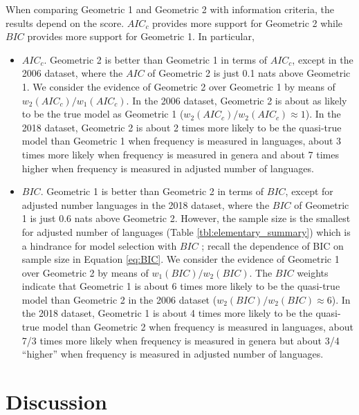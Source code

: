 \documentclass[USenglish]{article}
\begin{document}
When comparing Geometric 1 and Geometric 2 with information criteria, the results depend on the score. $AIC_c$ provides more support for Geometric 2 while $BIC$ provides more support for Geometric 1. In particular,
\begin{itemize}
\item
{\em $AIC_c$}. Geometric 2 is better than Geometric 1 in terms of $AIC_c$, except in the 2006 dataset, where the $AIC$ of Geometric 2 is just 0.1 nats above Geometric 1. 
We consider the evidence of Geometric 2 over Geometric 1 by means of $w_2(AIC_c)/w_1(AIC_c)$. In the 2006 dataset, Geometric 2 is about as likely to be the true model as Geometric 1 ($w_2(AIC_c)/w_2(AIC_c) \approx 1$). In the 2018 dataset, Geometric 2 is about 2 times more likely to be the quasi-true model than Geometric 1 when frequency is measured in languages, about 3 times more likely when frequency is measured in genera and about 7 times higher when frequency is measured in adjusted number of languages. 
\item
{\em $BIC$}. Geometric 1 is better than Geometric 2 in terms of $BIC$, except for adjusted number languages in the 2018 dataset, where the $BIC$ of Geometric 1 is just 0.6 nats above Geometric 2. However, the sample size is the smallest for adjusted number of languages (Table \ref{tbl:elementary_summary}) which is a hindrance for model selection with $BIC$ \citep[p. 288]{Burnham2002a}; recall the dependence of BIC on sample size in Equation \ref{eq:BIC}. 
We consider the evidence of Geometric 1 over Geometric 2 by means of $w_1(BIC)/w_2(BIC)$.
The $BIC$ weights indicate that Geometric 1 is about 6 times more likely to be the quasi-true model than Geometric 2 in the 2006 dataset ($w_2(BIC)/w_2(BIC) \approx 6$). In the 2018 dataset, Geometric 1 is about 4 times more likely to be the quasi-true model than Geometric 2 when frequency is measured in languages, about 7/3 times more likely when frequency is measured in genera but about 3/4 ``higher'' when frequency is measured in adjusted number of languages.
\end{itemize}

\section{Discussion}
\end{document}
